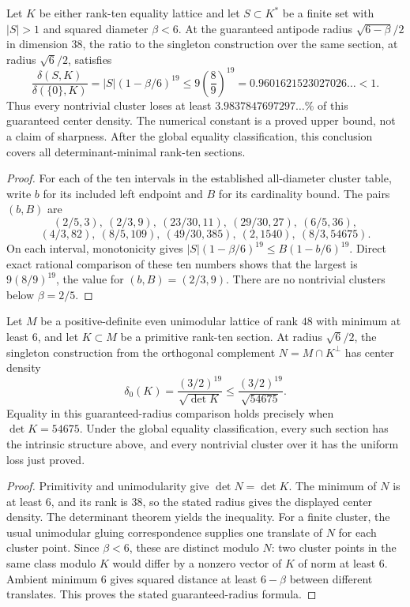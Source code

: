 \begin{corollary}
\label{cor:uniform-rank-ten-cluster-loss}
Let $K$ be either rank-ten equality lattice and let $S\subset K^*$
be a finite set with $|S|>1$ and squared diameter $\beta<6$.
At the guaranteed antipode radius $\sqrt{6-\beta}/2$ in dimension $38$,
the ratio to the singleton construction over the same section, at
radius $\sqrt6/2$, satisfies
\[
 \frac{\delta(S,K)}{\delta(\{0\},K)}
 =|S|(1-\beta/6)^{19}
 \le 9\left(\frac89\right)^{19}
 =0.9601621523027026\ldots<1.
\]
Thus every nontrivial cluster loses at least
$3.9837847697297\ldots\%$ of this guaranteed center density.
The numerical constant is a proved upper bound, not a claim of sharpness.
After the global equality classification, this conclusion covers all
determinant-minimal rank-ten sections.
\end{corollary}

\begin{proof}
For each of the ten intervals in the established all-diameter cluster
table, write $b$ for its included left endpoint and $B$ for its
cardinality bound. The pairs $(b,B)$ are
\[
 (2/5,3),\ (2/3,9),\ (23/30,11),\ (29/30,27),\ (6/5,36),
\]
\[
 (4/3,82),\ (8/5,109),\ (49/30,385),\ (2,1540),\ (8/3,54675).
\]
On each interval, monotonicity gives
$|S|(1-\beta/6)^{19}\le B(1-b/6)^{19}$.
Direct exact rational comparison of these ten numbers shows that the
largest is $9(8/9)^{19}$, the value for $(b,B)=(2/3,9)$.
There are no nontrivial clusters below $\beta=2/5$.
\end{proof}

\begin{corollary}
\label{cor:rank-ten-density-scope}
Let $M$ be a positive-definite even unimodular lattice of rank $48$
with minimum at least $6$, and let $K\subset M$ be a primitive
rank-ten section. At radius $\sqrt6/2$, the singleton construction
from the orthogonal complement $N=M\cap K^\perp$ has center density
\[
 \delta_0(K)=\frac{(3/2)^{19}}{\sqrt{\det K}}
 \le\frac{(3/2)^{19}}{\sqrt{54675}}.
\]
Equality in this guaranteed-radius comparison holds precisely when
$\det K=54675$. Under the global equality classification, every such
section has the intrinsic structure above, and every nontrivial
cluster over it has the uniform loss just proved.
\end{corollary}

\begin{proof}
Primitivity and unimodularity give $\det N=\det K$. The minimum of $N$
is at least $6$, and its rank is $38$, so the stated radius gives the
displayed center density. The determinant theorem yields the inequality.
For a finite cluster, the usual unimodular gluing correspondence supplies
one translate of $N$ for each cluster point. Since $\beta<6$, these are
distinct modulo $N$: two cluster points in the same class modulo $K$
would differ by a nonzero vector of $K$ of norm at least $6$.
Ambient minimum $6$ gives squared distance at least $6-\beta$ between
different translates. This proves the stated guaranteed-radius formula.
\end{proof}

